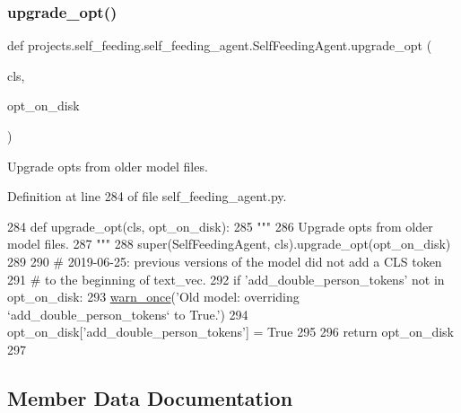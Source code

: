 \subsubsection{\texorpdfstring{upgrade\+\_\+opt()}{upgrade\_opt()}}
{\footnotesize\ttfamily def projects.\+self\+\_\+feeding.\+self\+\_\+feeding\+\_\+agent.\+Self\+Feeding\+Agent.\+upgrade\+\_\+opt (\begin{DoxyParamCaption}\item[{}]{cls,  }\item[{}]{opt\+\_\+on\+\_\+disk }\end{DoxyParamCaption})}

\begin{DoxyVerb}Upgrade opts from older model files.
\end{DoxyVerb}
 

Definition at line 284 of file self\+\_\+feeding\+\_\+agent.\+py.


\begin{DoxyCode}
284     \textcolor{keyword}{def }upgrade\_opt(cls, opt\_on\_disk):
285         \textcolor{stringliteral}{"""}
286 \textcolor{stringliteral}{        Upgrade opts from older model files.}
287 \textcolor{stringliteral}{        """}
288         super(SelfFeedingAgent, cls).upgrade\_opt(opt\_on\_disk)
289 
290         \textcolor{comment}{# 2019-06-25: previous versions of the model did not add a CLS token}
291         \textcolor{comment}{# to the beginning of text\_vec.}
292         \textcolor{keywordflow}{if} \textcolor{stringliteral}{'add\_double\_person\_tokens'} \textcolor{keywordflow}{not} \textcolor{keywordflow}{in} opt\_on\_disk:
293             \hyperlink{namespaceparlai_1_1utils_1_1misc_acf146e70ea7f6867969a7c2b545d4b4b}{warn\_once}(\textcolor{stringliteral}{'Old model: overriding `add\_double\_person\_tokens` to True.'})
294             opt\_on\_disk[\textcolor{stringliteral}{'add\_double\_person\_tokens'}] = \textcolor{keyword}{True}
295 
296         \textcolor{keywordflow}{return} opt\_on\_disk
297 
\end{DoxyCode}


\subsection{Member Data Documentation}
\mbox{\label{classprojects_1_1self__feeding_1_1self__feeding__agent_1_1SelfFeedingAgent_a02d034bc0c9208fb3d6561b90f176ddf}} 
